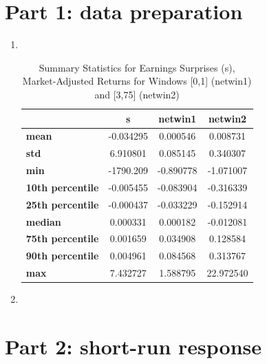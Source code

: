 \documentclass[11pt]{article}
\begin{document}

\section{Part 1: data preparation}

\begin{enumerate}
\renewcommand{\labelenumi}{(\theenumi)}
    \item \, \\
    \begin{table}[H]
        \centering
        \begin{tabular}{lccc}
        \hline
         & \textbf{s} & \textbf{netwin1} & \textbf{netwin2} \\
        \hline
        \textbf{mean} & -0.034295 & 0.000546 & 0.008731 \\
        \textbf{std} & 6.910801 & 0.085145 & 0.340307 \\
        \textbf{min} & -1790.209 & -0.890778 & -1.071007 \\
        \textbf{10th percentile} & -0.005455 & -0.083904 & -0.316339 \\
        \textbf{25th percentile} & -0.000437 & -0.033229 & -0.152914 \\
        \textbf{median} & 0.000331 & 0.000182 & -0.012081 \\
        \textbf{75th percentile} & 0.001659 & 0.034908 & 0.128584 \\
        \textbf{90th percentile} & 0.004961 & 0.084568 & 0.313767 \\
        \textbf{max} & 7.432727 & 1.588795 & 22.972540 \\
        \hline
        \end{tabular}
        \caption{Summary Statistics for Earnings Surprises (s), Market-Adjusted Returns for Windows [0,1] (netwin1) and [3,75] (netwin2)}
    \end{table}

    \item
        
\end{enumerate}

\section{Part 2: short-run response}
\end{document}
